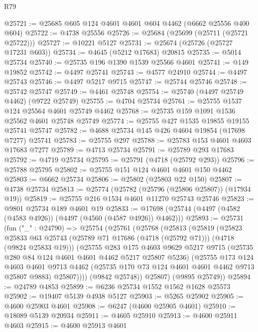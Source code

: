 \begin{lexlean}{R79}
\begin{coremodule}
@25721 := @25685 @605 @124 @4601 @4601 @604 @4462 (@6662 @25556 @400 @604)
@25722 := @4738 @25556
@25726 := @25684 (@25699 (@25711 (@25721 @25722)))
@25727 := @10221 @5127
@25731 := @25674 (@25726 (@25727 @17231 @603))
@25734 := @4645 (@5212 @17683) @20815
@25735 := @5014 @25734
@25740 := @25735 @196 @1390 @1539 @25566 @4601
@25741 := @149 @19852
@25742 := @4497 @25741
@25743 := @4577 @24910
@25744 := @4497 @25743
@25746 := @4497 @5217 @9715
@25747 := @25744 @25746
@25748 := @25742 @25747
@25749 := @4461 @25748
@25754 := @25740 (@4497 @25749 @4462) (@9722 @25749)
@25755 := @4704 @25734
@25761 := @25755 @1537 @124 @25564 @4601 @25749 @4462
@25768 := @25735 @159 @1091 @1536 @25562 @4601 @25748 @25749
@25774 := @25755 @427 @1535 @19855 @19155 @25741 @25747
@25782 := @4688 @25734 @145 @426 @4604 @19854 (@17698 @7277) @25741
@25783 := @25755 @297
@25788 := @25783 @153 @4601 @4603 @17683 @7277
@25789 := @4713 @25734
@25791 := @25789 @293 @17683
@25792 := @4719 @25734
@25795 := @25791 (@4718 (@25792 @293))
@25796 := @25788 @25795
@25802 := @25755 @151 @124 @4601 @4601 @150 @4462
@25803 := @6662 @25734
@25806 := @25802 (@25803 @22 @150)
@25807 := @4738 @25734
@25813 := @25774 (@25782 (@25796 (@25806 @25807)) (@17934 @19))
@25819 := @25755 @216 @1534 @4601 @11270 @25743 @25746
@25823 := @9801 @25734 @189 @4601 @19
@25833 := @17698 (@25744 (@4497 (@4582 (@4583 @4926)) (@4497 (@4560 (@4587 @4926)) @4462)))
@25893 := @25731
    (fun ("_" : @24790) =>
    @25754
      (@25761
        (@25768
          (@25813
            (@25819
              (@25823
                @25833
                @63
                @25743
                (@25789 @71 @17686 (@4718 (@25792 @71)))
                (@4718 (@9824 @25833 @19)))
              (@25755
                @283
                @175
                @4603
                @9629
                @5217
                @9715
                (@25735 @280 @84 @124 @4601 @4601 @4462 @5217 @25807 @5236)
                (@25755
                  @173
                  @124
                  @4603
                  @4601
                  @9713
                  @4462
                  (@25735 @170 @73 @124 @4601 @4601 @4462 @9713 @25807 @9883)
                  @25807))))
          (@9842 @25748))
        @25807)
      (@9895 @25749))
@25894 := @24789 @4853
@25899 := @6236 @25734 @1552 @1562 @1628 @25573
@25902 := @19407 @5139 @4938 @5127
@25903 := @5265 @25902
@25905 := @4600 @25903 @4601
@25908 := @6247 (@4600 @25905 @4601)
@25910 := @18089 @5139 @20934
@25911 := @4605 @25910
@25913 := @4600 @25911 @4603
@25915 := @4600 @25913 @4601

\end{coremodule}
\end{lexlean}
